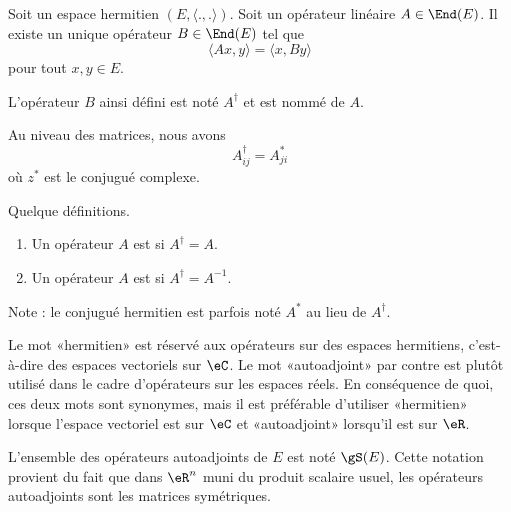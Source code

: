 \begin{propositionDef}     \label{PROPooRPRRooRYEMCB}
	Soit un espace hermitien \( (E,\langle ., .\rangle )\). Soit un opérateur linéaire \( A\in\End(E)\). Il existe un unique opérateur \( B\in\End(E)\) tel que
	\begin{equation}
		\langle Ax, y\rangle =\langle x, By\rangle
	\end{equation}
	pour tout \( x,y\in E\).

	L'opérateur \( B\) ainsi défini est noté \( A^{\dag}\) et est nommé  de \( A\).
\end{propositionDef}

\begin{lemma}       \label{LEMooBOXMooSDyCfm}
	Au niveau des matrices, nous avons
	\begin{equation}
		A^{\dag}_{ij}=A^*_{ji}
	\end{equation}
	où \( z^*\) est le conjugué complexe.
\end{lemma}

\begin{definition}      \label{DEFooKEBHooWwCKRK}
	Quelque définitions.
	\begin{enumerate}
		\item
		      Un opérateur \( A\) est  si \( A^{\dag}=A\).
		\item
		      Un opérateur \( A\) est  si \( A^{\dag}=A^{-1}\).
	\end{enumerate}
	Note : le conjugué hermitien est parfois noté \( A^*\) au lieu de \( A^{\dag}\).
\end{definition}

\begin{normaltext}	\label{NORMooYCCGooYyOEdo}
	Le mot «hermitien» est réservé aux opérateurs sur des espaces hermitiens, c'est-à-dire des espaces vectoriels sur \( \eC\). Le mot «autoadjoint» par contre est plutôt utilisé dans le cadre d'opérateurs sur les espaces réels. En conséquence de quoi, ces deux mots sont synonymes, mais il est préférable d'utiliser «hermitien» lorsque l'espace vectoriel est sur \( \eC\) et «autoadjoint» lorsqu'il est sur \( \eR\).

	L'ensemble des opérateurs autoadjoints de \( E\) est noté \( \gS(E)\). Cette notation provient du fait que dans \( \eR^n\) muni du produit scalaire usuel, les opérateurs autoadjoints sont les matrices symétriques.
\end{normaltext}

